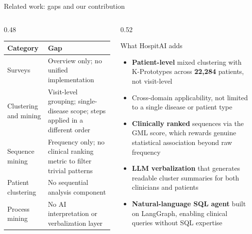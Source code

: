\documentclass[aspectratio=169,11pt]{beamer}
\newcommand{\stat}[1]{{\color{hosporange}\bfseries #1}}
\newcommand{\kw}[1]{{\color{hospaccent}\bfseries #1}}
\begin{document}
\begin{frame}{Related work: gaps and our contribution}
  \begin{columns}[T]
    \begin{column}{0.48\textwidth}
      \scriptsize
      \renewcommand{\arraystretch}{1.25}
      \begin{tabular}{@{}>{\raggedright}p{2.0cm} >{\raggedright\arraybackslash}p{3.6cm}@{}}
        \toprule
        \textbf{Category} & \textbf{Gap} \\
        \midrule
        Surveys & Overview only; no unified implementation \\[3pt]
        Clustering and mining & Visit-level grouping; single-disease scope; steps applied in a different order \\[3pt]
        Sequence mining & Frequency only; no clinical ranking metric to filter trivial patterns \\[3pt]
        Patient clustering & No sequential analysis component \\[3pt]
        Process mining & No AI interpretation or verbalization layer \\
        \bottomrule
      \end{tabular}
    \end{column}
    \begin{column}{0.52\textwidth}
      \begin{block}{What HospitAI adds}
        \scriptsize
        \begin{itemize}\setlength{\itemsep}{0.4em}
          \item \kw{Patient-level} mixed clustering with K-Prototypes across \stat{22,284} patients, not visit-level
          \item Cross-domain applicability, not limited to a single disease or patient type
          \item \kw{Clinically ranked} sequences via the GML score, which rewards genuine statistical association beyond raw frequency
          \item \kw{LLM verbalization} that generates readable cluster summaries for both clinicians and patients
          \item \kw{Natural-language SQL agent} built on LangGraph, enabling clinical queries without SQL expertise
        \end{itemize}
      \end{block}
    \end{column}
  \end{columns}
\end{frame}
\end{document}

